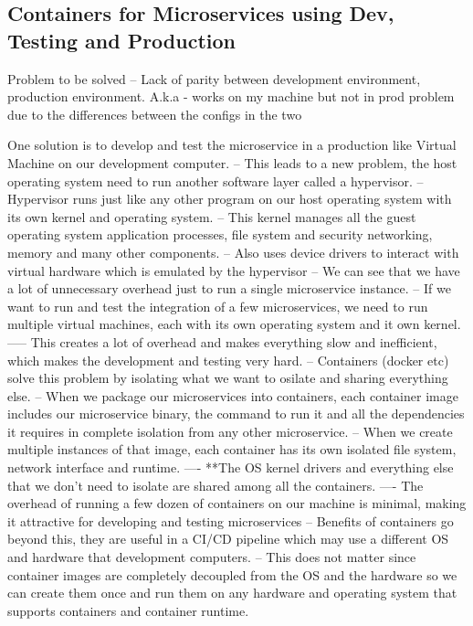 \documentclass[a4paper, 11pt]{book}
\begin{document}
    \subsection{Containers for Microservices using Dev, Testing and Production}
    Problem to be solved -- Lack of parity between development environment, production environment.
    A.k.a - works on my machine but not in prod problem due to the differences between the configs in the two

    One solution is to develop and test the microservice in a production like Virtual Machine on our development computer.
    -- This leads to a new problem, the host operating system need to run another software layer called a hypervisor.
    -- Hypervisor runs just like any other program on our host operating system with its own kernel and operating system.
    -- This kernel manages all the guest operating system application processes, file system and security networking, memory and many other components.
    -- Also uses device drivers to interact with virtual hardware which is emulated by the hypervisor
    -- We can see that we have a lot of unnecessary overhead just to run a single microservice instance.
    -- If we want to run and test the integration of a few microservices, we need to run multiple virtual machines, each with its own operating system and it own kernel.
    ----- This creates a lot of overhead and makes everything slow and inefficient, which makes the development and testing very hard.
    -- Containers (docker etc) solve this problem by isolating what we want to osilate and sharing everything else.
    -- When we package our microservices into containers, each container image includes our microservice binary, the command to run it and all the dependencies it requires in complete isolation from any other microservice.
    -- When we create multiple instances of that image, each container has its own isolated file system, network interface and runtime.
    ---- **The OS kernel drivers and everything else that we don't need to isolate are shared among all the containers.
    ---- The overhead of running a few dozen of containers on our machine is minimal, making it attractive for developing and testing microservices
    -- Benefits of containers go beyond this, they are useful in a CI/CD pipeline which may use a different OS and hardware that development computers.
    -- This does not matter since container images are completely decoupled from the OS and the hardware so we can create them once and run them on any hardware and operating system that supports containers and container runtime.
\end{document}
